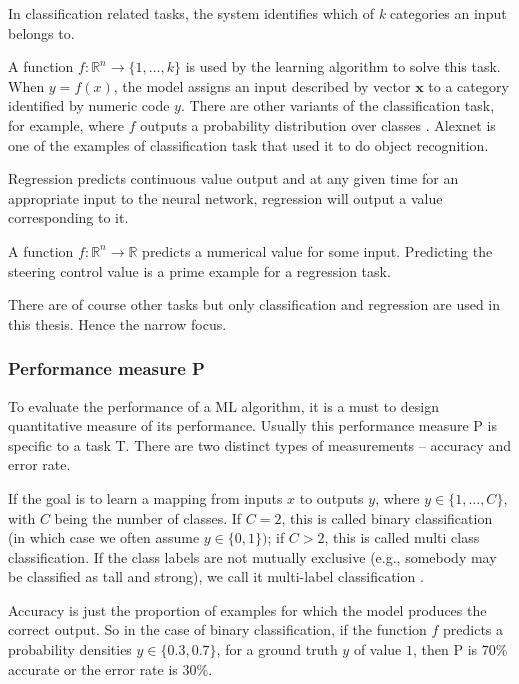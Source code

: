 In classification related tasks, the system identifies which of \textit{k} categories an
input belongs to.

A function $f : \mathbb{R}^n \rightarrow\{1, \ldots,k\}$ is used by the
learning algorithm to solve this task. When $y = f(x)$, the model assigns an input
described by vector $\mathbf{x}$ to a category
identified by numeric code $y$. There are other variants of the classification
task, for example, where $f$ outputs a probability distribution over classes
\cite{Goodfellow-et-al-2016_1}. Alexnet \cite{Alexnet2012} is one of the examples of
classification task that used it to do object recognition.

Regression predicts continuous value output and at any given time for an appropriate
input to the neural network, regression will output a value corresponding to it.

A function $f: \mathbb{R}^n \rightarrow \mathbb{R}$ predicts a numerical value for some input.
Predicting the steering control value is a prime example for a regression task.

There are of course other tasks but only classification and regression are used in this
thesis. Hence the narrow focus.

\subsubsection*{Performance measure P}
To evaluate the performance of a ML algorithm, it is a must to design quantitative measure
of its performance. Usually this performance measure P is specific to a task T. There
are two distinct types of measurements -- accuracy and error rate.

If the goal is to learn a mapping from inputs $x$ to outputs $y$, where $y \in \{1,\ldots
, C\}$, with $C$ being the number of classes. If $C = 2$, this is
called binary classification (in which case we often assume $y \in \{0, 1\})$; if $C > 2$, this is called
multi class classification. If the class labels are not mutually exclusive (e.g., somebody may be
classified as tall and strong), we call it multi-label classification
\cite{murphy2013machine_1}.

Accuracy is just the proportion of examples for which the model produces the correct output.
So in the case of binary classification, if the function $f$ predicts a probability
densities $\hat y \in \{0.3, 0.7\}$, for a ground truth $y$ of value $1$, then P is $70\%$
accurate or the error rate is $30\%$.

